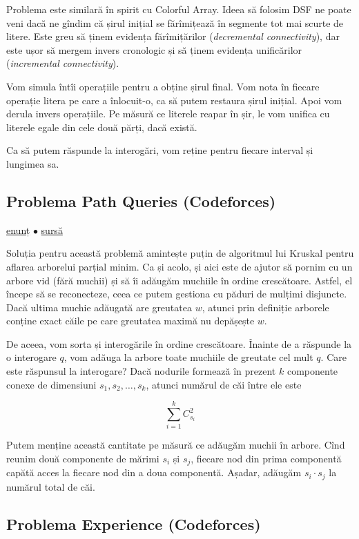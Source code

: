 \documentclass[../main.tex]{subfiles}
\begin{document}
Problema este similară în spirit cu Colorful Array. Ideea să folosim DSF ne poate veni dacă ne gîndim că șirul inițial se fărîmițează în segmente tot mai scurte de litere. Este greu să ținem evidența fărîmițărilor (\textit{decremental connectivity}), dar este ușor să mergem invers cronologic și să ținem evidența unificărilor (\textit{incremental connectivity}).

Vom simula întîi operațiile pentru a obține șirul final. Vom nota în fiecare operație litera pe care a înlocuit-o, ca să putem restaura șirul inițial. Apoi vom derula invers operațiile. Pe măsură ce literele reapar în șir, le vom unifica cu literele egale din cele două părți, dacă există.

Ca să putem răspunde la interogări, vom reține pentru fiecare interval și lungimea sa.


\subsection{Problema Path Queries (Codeforces)}
\label{problem:path-queries-2}

\href{https://codeforces.com/contest/1213/problem/G}{enunț}
$\bullet$
\hyperref[code:path-queries-2]{sursă}

Soluția pentru această problemă amintește puțin de algoritmul lui Kruskal pentru aflarea arborelui parțial minim. Ca și acolo, și aici este de ajutor să pornim cu un arbore vid (fără muchii) și să îi adăugăm muchiile în ordine crescătoare. Astfel, el începe să se reconecteze, ceea ce putem gestiona cu păduri de mulțimi disjuncte. Dacă ultima muchie adăugată are greutatea $w$, atunci prin definiție arborele conține exact căile pe care greutatea maximă nu depășește $w$.

De aceea, vom sorta și interogările în ordine crescătoare. Înainte de a răspunde la o interogare $q$, vom adăuga la arbore toate muchiile de greutate cel mult $q$. Care este răspunsul la interogare? Dacă nodurile formează în prezent $k$ componente conexe de dimensiuni $s_1, s_2, \dots, s_k$, atunci numărul de căi între ele este

$$\sum_{i=1}^{k} C_{s_i}^2$$

Putem menține această cantitate pe măsură ce adăugăm muchii în arbore. Cînd reunim două componente de mărimi $s_i$ și $s_j$, fiecare nod din prima componentă capătă acces la fiecare nod din a doua componentă. Așadar, adăugăm $s_i \cdot s_j$ la numărul total de căi.


\subsection{Problema Experience (Codeforces)}
\label{problem:experience}
\end{document}
